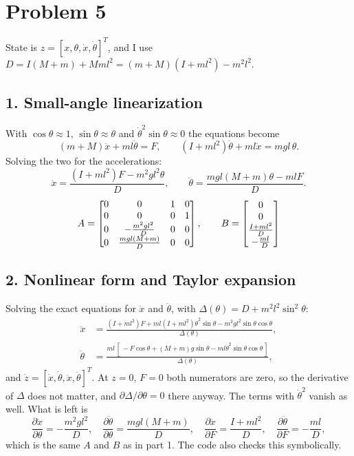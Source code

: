 \section*{Problem 5}

State is $z=[x,\theta,\dot x,\dot\theta]^T$, and I use $D=I(M+m)+Mml^2=(m+M)(I+ml^2)-m^2l^2$.

\subsection*{1. Small-angle linearization}

With $\cos\theta\approx1$, $\sin\theta\approx\theta$ and $\dot\theta^2\sin\theta\approx0$ the equations become
\[
(m+M)\ddot x+ml\ddot\theta=F,\qquad (I+ml^2)\ddot\theta+ml\ddot x=mgl\,\theta .
\]
Solving the two for the accelerations:
\[
\ddot x=\frac{(I+ml^2)F-m^2gl^2\theta}{D},\qquad
\ddot\theta=\frac{mgl(M+m)\theta-mlF}{D}.
\]
\[
A=\begin{bmatrix}0&0&1&0\\0&0&0&1\\0&-\frac{m^2gl^2}{D}&0&0\\0&\frac{mgl(M+m)}{D}&0&0\end{bmatrix},\qquad
B=\begin{bmatrix}0\\0\\\frac{I+ml^2}{D}\\-\frac{ml}{D}\end{bmatrix}
\]

\subsection*{2. Nonlinear form and Taylor expansion}

Solving the exact equations for $\ddot x$ and $\ddot\theta$, with $\Delta(\theta)=D+m^2l^2\sin^2\theta$:
\begin{align*}
\ddot x&=\frac{(I+ml^2)F+ml(I+ml^2)\dot\theta^2\sin\theta-m^2gl^2\sin\theta\cos\theta}{\Delta(\theta)},\\
\ddot\theta&=\frac{ml\,[\,-F\cos\theta+(M+m)g\sin\theta-ml\dot\theta^2\sin\theta\cos\theta\,]}{\Delta(\theta)},
\end{align*}
and $\dot z=[\dot x,\dot\theta,\ddot x,\ddot\theta]^T$. At $z=0$, $F=0$ both numerators are zero, so the derivative of $\Delta$ does not matter, and $\partial\Delta/\partial\theta=0$ there anyway. The terms with $\dot\theta^2$ vanish as well. What is left is
\[
\frac{\partial\ddot x}{\partial\theta}=-\frac{m^2gl^2}{D},\quad
\frac{\partial\ddot\theta}{\partial\theta}=\frac{mgl(M+m)}{D},\quad
\frac{\partial\ddot x}{\partial F}=\frac{I+ml^2}{D},\quad
\frac{\partial\ddot\theta}{\partial F}=-\frac{ml}{D},
\]
which is the same $A$ and $B$ as in part 1. The code also checks this symbolically.

